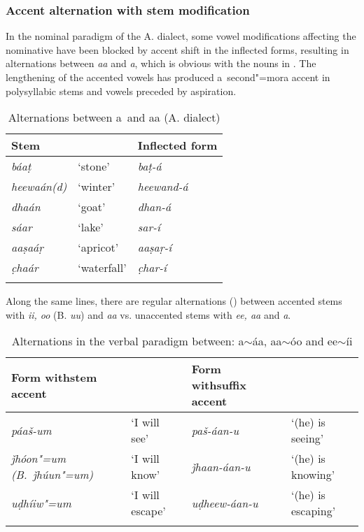 \subsubsection*{Accent alternation with stem modification}

In the nominal paradigm of the A. dialect, some vowel modifications affecting the nominative have been blocked by accent shift in the inflected forms, resulting in alternations between \textit{aa} and \textit{a}, which is obvious with the nouns in . The lengthening of the accented vowels has produced a~second"=mora accent in polysyllabic stems and vowels preceded by aspiration. 

\begin{table}[ht]
\caption{Alternations between a~and aa (A. dialect)}
\begin{tabularx}{.75\textwidth}{ Q Q Q }
\lsptoprule
Stem &
&
Inflected form\\\hline
\textit{báaṭ} &
`stone' &
\textit{baṭ-á} \\
\textit{heewaán(d)} &
`winter' &
\textit{heewand-á} \\
\textit{dhaán} &
`goat' &
\textit{dhan-á}\\
\textit{sáar} &
`lake' &
\textit{sar-í}\\
\textit{aaṣaáṛ} &
`apricot' &
\textit{aaṣaṛ-í} \\
\textit{c̣haár} &
`waterfall' &
\textit{c̣har-í} \\\lspbottomrule
\end{tabularx}
\label{tab:3-13}
\end{table}


Along the same lines, there are regular alternations () between accented stems with \textit{ii, oo} (B. \textit{uu}) and \textit{aa} vs. unaccented stems with \textit{ee, aa} and \textit{a}.



\begin{table}[ht]
\caption{Alternations in the verbal paradigm between: a$\sim$áa, aa$\sim$óo and ee$\sim$íi}
\begin{tabularx}{\textwidth}{ Q l Q l }
\lsptoprule
Form with\newline stem accent &
&
Form with\newline suffix accent &
\\\hline
\textit{páaš-um} &
`I will see' &
\textit{paš-áan-u} &
`(he) is seeing'\\
\textit{ǰhóon"=um (B.~ǰhúun"=um)} &
`I will know' &
\textit{ǰhaan-áan-u} &
`(he) is knowing'\\
\textit{uḍhíiw"=um} &
`I will escape' &
\textit{uḍheew-áan-u} &
`(he) is escaping'\\\lspbottomrule
\end{tabularx}
\label{tab:3-14}
\end{table}

